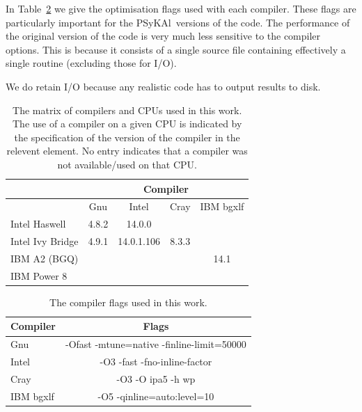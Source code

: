 \documentclass[journal]{IEEEtran}
\newcommand{\psykal}{{PS}y{KA}l\ }
\begin{document}
In Table~\ref{TABLE_compiler_flags} we give the optimisation flags
used with each compiler. These flags are particularly important for
the \psykal versions of the code. The performance of the original
version of the code is very much less sensitive to the compiler
options. This is because it consists of a single source file
containing effectively a single routine (excluding those for I/O).

We do retain I/O because any realistic code has to output results to disk.

%
\begin{table}[!t]
\renewcommand{\arraystretch}{1.3}
\caption{The matrix of compilers and CPUs used in this work. The use
  of a compiler on a given CPU is indicated by the specification of
  the version of the compiler in the relevent element. No entry
  indicates that a compiler was not available/used on that CPU.}
\label{TABLE_compilers}
\centering
\begin{tabular}{|l|c|c|c|c|}
\hline
                 & \multicolumn{4}{c|}{Compiler}             \\
\hline
                 & Gnu   & Intel       & Cray    & IBM bgxlf\\
\hline
Intel Haswell    & 4.8.2 & 14.0.0      &         &          \\
Intel Ivy Bridge & 4.9.1 & 14.0.1.106  & 8.3.3   &          \\
IBM A2 (BGQ)     &       &             &         & 14.1     \\
IBM Power 8      &       &             &         &          \\
\hline
\end{tabular}
\end{table}

\begin{table}[!t]
\renewcommand{\arraystretch}{1.3}
\caption{The compiler flags used in this work.}
\label{TABLE_compiler_flags}
\centering
\begin{tabular}{l|c}
\hline
Compiler  &  Flags \\
\hline
Gnu       & -Ofast -mtune=native -finline-limit=50000    \\
Intel     & -O3 -fast -fno-inline-factor    \\
Cray      & -O3 -O ipa5 -h wp    \\
IBM bgxlf & -O5 -qinline=auto:level=10    \\
\hline
\end{tabular}
\end{table}
\end{document}
